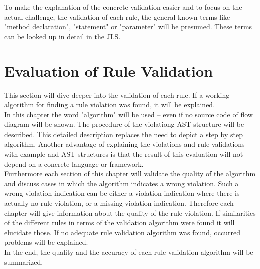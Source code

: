 To make the explanation of the concrete validation easier and to focus on the actual challenge, the validation of each rule, the general known terms like "method declaration", "statement" or "parameter" will be presumed. These terms can be looked up in detail in the \acf{JLS}\cite{jls}. 

\section{Evaluation of Rule Validation}
\label{e:evaluation}
This section will dive deeper into the validation of each rule. If a working algorithm for finding a rule violation was found, it will be explained.
\\

In this chapter the word "algorithm" will be used -- even if no source code of flow diagram will be shown. The procedure of the violationg \acf{AST}  structure will be described. This detailed description replaces the need to depict a step by step algorithm. Another advantage of explaining the violations and rule validations with example and \acf{AST} structures is that the result of this evaluation will not depend on a concrete language or framework. 
\\

Furthermore each section of this chapter will validate the quality of the algorithm and discuss cases in which the algorithm indicates a wrong violation. Such a wrong violation indication can be either a violation indication where there is actually no rule violation, or a missing violation indication. Therefore each chapter will give information about the quality of the rule violation. If similarities of the different rules in terms of the validation algorithm were found it will elucidate those. If no adequate rule validation algorithm was found, occurred problems will be explained.
\\

In the end, the quality and the accuracy of each rule validation algorithm will be summarized. 



  
